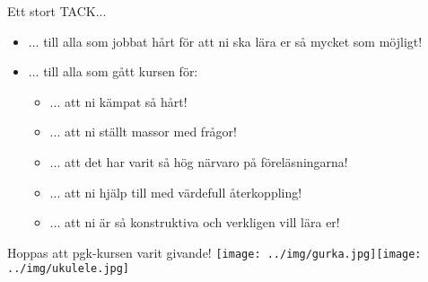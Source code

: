 \begin{Slide}{Ett stort TACK...}
\begin{itemize}
  \item
... till alla  som jobbat hårt för att ni ska lära er så mycket som möjligt!
\item ... till alla  som gått kursen för:
\begin{itemize}
\item ... att ni kämpat så hårt!
\item ... att ni ställt massor med frågor!
\item ... att det har varit så hög närvaro på föreläsningarna!
\item ... att ni hjälp till med värdefull återkoppling!
\item ... att ni är så konstruktiva och verkligen vill lära er!
\end{itemize}
\vspace{2em} \pause

\end{itemize}
\end{Slide}

\begin{Slide}{Hoppas att pgk-kursen varit givande!}
\texttt{[image: ../img/gurka.jpg]}\texttt{[image: ../img/ukulele.jpg]}
\end{Slide}











